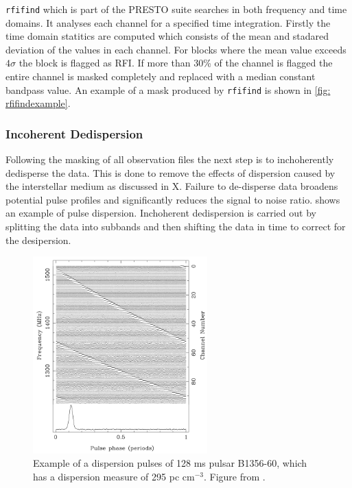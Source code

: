 \texttt{rfifind} which is part of the PRESTO suite searches in both frequency and time domains. It analyses each channel for a specified time integration. Firstly the time domain statitics are computed which consists of the mean and stadared deviation of the values in each channel. For blocks where the mean value exceeds $4\sigma$ the block is flagged as RFI. If more than 30\% of the channel is flagged the entire channel is masked completely and replaced with a median constant bandpass value. An example of a mask produced by \texttt{rfifind} is shown in \cref{fig: rfifindexample}. 

\subsubsection{Incoherent Dedispersion}

Following the masking of all observation files the next step is to inchoherently dedisperse the data. This is done to remove the effects of dispersion caused by the interstellar medium as discussed in X. Failure to de-disperse data broadens potential pulse profiles and significantly reduces the signal to noise ratio.  shows an example of pulse dispersion. Inchoherent dedispersion is carried out by splitting the data into subbands and then shifting the data in time to correct for the desipersion. 


\begin{figure}
    \centering
    \includegraphics[width = 0.6\textwidth]{figs/DM_pulse_example.png}
    \caption{Example of a dispersion pulses of 128 ms pulsar B1356-60, which has a dispersion measure of 295 pc cm$^{-3}$. Figure from \citet[p.~20]{pulsar_handbook}.}
    \label{fig: DM_pulse_example}
\end{figure}

